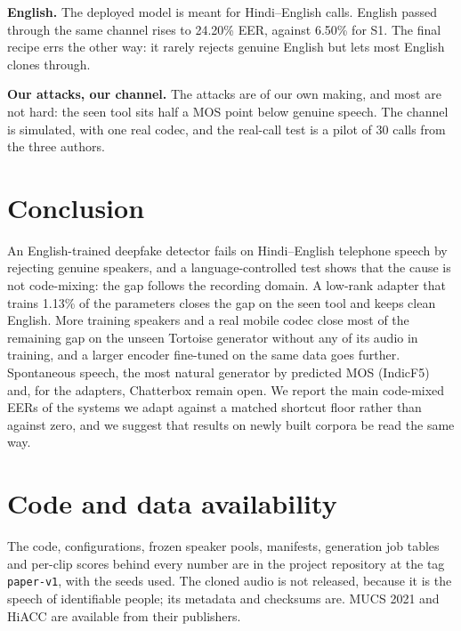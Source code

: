 \documentclass[conference]{IEEEtran}
\begin{document}
\textbf{English.} The deployed model is meant for Hindi--English calls. English passed
through the same channel rises to 24.20\% EER, against 6.50\% for S1. The final recipe
errs the other way: it rarely rejects genuine English but lets most English clones
through.

\textbf{Our attacks, our channel.} The attacks are of our own making, and most are not
hard: the seen tool sits half a MOS point below genuine speech. The channel is simulated,
with one real codec, and the real-call test is a pilot of 30 calls from the three authors.

\section{Conclusion}

An English-trained deepfake detector fails on Hindi--English telephone speech by rejecting
genuine speakers, and a language-controlled test shows that the cause is not code-mixing:
the gap follows the recording domain. A low-rank adapter that trains 1.13\% of the
parameters closes the gap on the seen tool and keeps clean English. More training speakers
and a real mobile codec close most of the remaining gap on the unseen Tortoise generator
without any of its audio in training, and a larger encoder fine-tuned on the same data goes
further. Spontaneous speech, the most natural generator by predicted MOS (IndicF5) and, for the
adapters, Chatterbox remain open. We report the main code-mixed EERs of the systems we adapt
against a matched shortcut
floor rather than against zero, and we suggest that results on
newly built corpora be read the same way.

\section*{Code and data availability}

The code, configurations, frozen speaker pools, manifests, generation job tables and
per-clip scores behind every number are in the project repository at the tag
\texttt{paper-v1}, with the seeds used. The cloned audio is not released, because it is
the speech of identifiable people; its metadata and checksums are. MUCS 2021 and HiACC are
available from their publishers.




\end{document}
